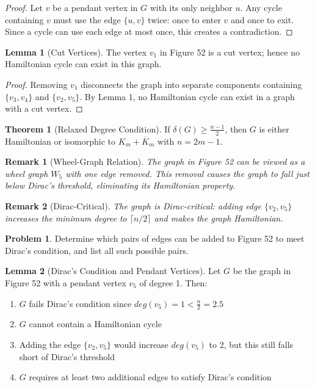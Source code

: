 \documentclass{article}
\newtheorem{remark}{Remark}
\theoremstyle{definition}
\newtheorem{problem}{Problem}
\def\deg{deg}%
\newtheorem{theorem}{Theorem}
\newtheorem{lemma}{Lemma}
\begin{document}
\begin{proof}
Let $v$ be a pendant vertex in $G$ with its only neighbor $u$. Any cycle containing $v$ must use the edge $\{u,v\}$ twice: once to enter $v$ and once to exit. Since a cycle can use each edge at most once, this creates a contradiction.
\end{proof}

\begin{lemma}[Cut Vertices]
The vertex $v_1$ in Figure 52 is a cut vertex; hence no Hamiltonian cycle can exist in this graph.
\end{lemma}

\begin{proof}
Removing $v_1$ disconnects the graph into separate components containing $\{v_3,v_4\}$ and $\{v_2,v_5\}$. By Lemma 1, no Hamiltonian cycle can exist in a graph with a cut vertex.
\end{proof}

\begin{theorem}[Relaxed Degree Condition]
If $\delta(G) \geq \frac{n-1}{2}$, then $G$ is either Hamiltonian or isomorphic to $K_m + \overline{K}_m$ with $n = 2m-1$.
\end{theorem}

\begin{remark}[Wheel-Graph Relation]
The graph in Figure 52 can be viewed as a wheel graph $W_5$ with one edge removed. This removal causes the graph to fall just below Dirac's threshold, eliminating its Hamiltonian property.
\end{remark}

\begin{remark}[Dirac-Critical]
The graph is Dirac-critical: adding edge $\{v_2,v_5\}$ increases the minimum degree to $\lceil n/2 \rceil$ and makes the graph Hamiltonian.
\end{remark}

\begin{problem}
Determine which pairs of edges can be added to Figure 52 to meet Dirac's condition, and list all such possible pairs.
\end{problem}
\begin{lemma}[Dirac's Condition and Pendant Vertices]
Let $G$ be the graph in Figure 52 with a pendant vertex $v_5$ of degree 1. Then:
\begin{enumerate}
    \item $G$ fails Dirac's condition since $\deg(v_5) = 1 < \frac{n}{2} = 2.5$
    \item $G$ cannot contain a Hamiltonian cycle
    \item Adding the edge $\{v_2, v_5\}$ would increase $\deg(v_5)$ to 2, but this still falls short of Dirac's threshold
    \item $G$ requires at least two additional edges to satisfy Dirac's condition
\end{enumerate}
\end{lemma}
\end{document}
